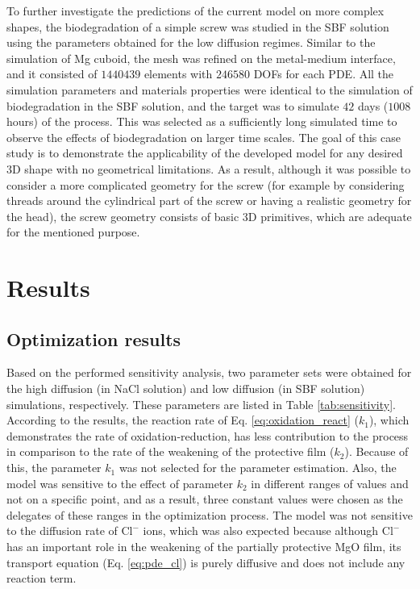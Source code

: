 To further investigate the predictions of the current model on more complex shapes, the biodegradation of a simple screw was studied in the {SBF} solution using the parameters obtained for the low diffusion regimes. Similar to the simulation of Mg cuboid, the mesh was refined on the metal-medium interface, and it consisted of $\num{1440439}$ elements with $\num{246580}$ {DOF}s for each {PDE}. All the simulation parameters and materials properties were identical to the simulation of biodegradation in the {SBF} solution, and the target was to simulate $42$ days ($1008$ hours) of the process. This was selected as a sufficiently long simulated time to observe the effects of biodegradation on larger time scales. The goal of this case study is to demonstrate the applicability of the developed model for any desired 3D shape with no geometrical limitations. As a result, although it was possible to consider a more complicated geometry for the screw (for example by considering threads around the cylindrical part of the screw or having a realistic geometry for the head), the screw geometry consists of basic 3D primitives, which are adequate for the mentioned purpose.

\section{Results}

\subsection{Optimization results}

Based on the performed sensitivity analysis, two parameter sets were obtained for the high diffusion (in NaCl solution) and low diffusion (in {SBF} solution) simulations, respectively. These parameters are listed in Table \ref{tab:sensitivity}. According to the results, the reaction rate of  Eq. \ref{eq:oxidation_react} ($k_1$), which demonstrates the rate of oxidation-reduction, has less contribution to the process in comparison to the rate of the weakening of the protective film ($k_2$). Because of this, the parameter $k_1$ was not selected for the parameter estimation. Also, the model was sensitive to the effect of parameter $k_2$ in different ranges of values and not on a specific point, and as a result, three constant values were chosen as the delegates of these ranges in the optimization process. The model was not sensitive to the diffusion rate of $\mathrm{Cl}^{-}$ ions, which was also expected because although $\mathrm{Cl}^{-}$ has an important role in the weakening of the partially protective MgO film, its transport equation (Eq. \ref{eq:pde_cl}) is purely diffusive and does not include any reaction term.


